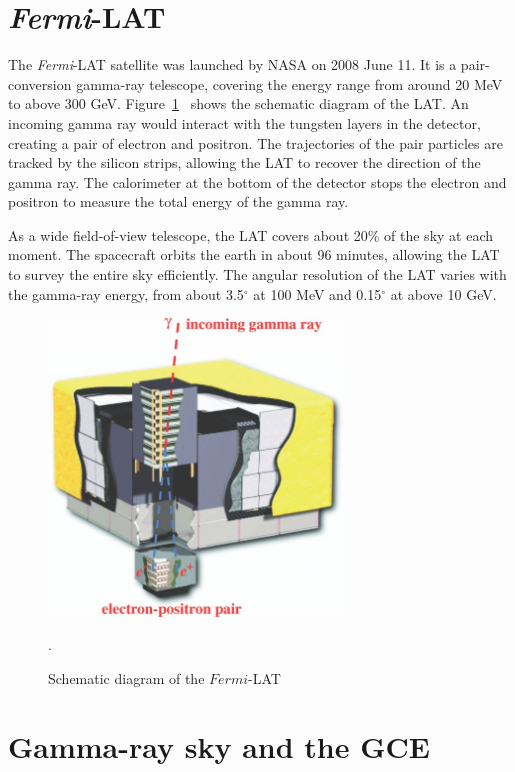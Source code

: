 \documentclass[doublespace,nopageskip]{VTthesis} %
\begin{document}
\section{\textit{Fermi}-LAT}

The \textit{Fermi}-LAT satellite was launched by NASA on 2008 June 11. It is a pair-conversion gamma-ray telescope, covering the energy range from around 20 MeV to above 300 GeV. Figure~\ref{fig:lat}~\cite{2009ApJ...697.1071A} shows the schematic diagram of the LAT. An incoming gamma ray would interact with the tungsten layers in the detector, creating a pair of electron and positron. The trajectories of the pair particles are tracked by the silicon strips, allowing the LAT to recover the direction of the gamma ray. The calorimeter at the bottom of the detector stops the electron and positron to measure the total energy of the gamma ray.

As a wide field-of-view telescope, the LAT covers about 20\% of the sky at each moment. The spacecraft orbits the earth in about 96 minutes, allowing the LAT to survey the entire sky efficiently. The angular resolution of the LAT varies with the gamma-ray energy, from about 3.5$^\circ$ at 100 MeV and 0.15$^\circ$ at above 10 GeV.

\begin{figure}[htb]
    \centering
    \includegraphics[width=0.7\textwidth]{Figures/Intro/lat.jpg}
    \caption{Schematic diagram of the $Fermi$-LAT~\cite{2009ApJ...697.1071A}}.
    \label{fig:lat}
\end{figure}

\section{Gamma-ray sky and the GCE}
\end{document}
